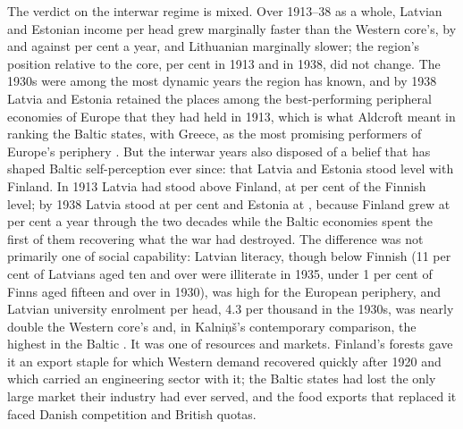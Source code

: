 


The verdict on the interwar regime is mixed. Over 1913--38 as a whole, Latvian and Estonian income per head grew marginally faster than the Western core's, by  and  against  per cent a year, and Lithuanian marginally slower; the region's position relative to the core,  per cent in 1913 and  in 1938, did not change. The 1930s were among the most dynamic years the region has known, and by 1938 Latvia and Estonia retained the places among the best-performing peripheral economies of Europe that they had held in 1913, which is what Aldcroft meant in ranking the Baltic states, with Greece, as the most promising performers of Europe's periphery \parencite[105, 171]{aldcroftthirdworld}. But the interwar years also disposed of a belief that has shaped Baltic self-perception ever since: that Latvia and Estonia stood level with Finland. In 1913 Latvia had stood above Finland, at  per cent of the Finnish level; by 1938 Latvia stood at  per cent and Estonia at , because Finland grew at  per cent a year through the two decades while the Baltic economies spent the first of them recovering what the war had destroyed. The difference was not primarily one of social capability: Latvian literacy, though below Finnish (11 per cent of Latvians aged ten and over were illiterate in 1935, under 1 per cent of Finns aged fifteen and over in 1930), was high for the European periphery, and Latvian university enrolment per head, 4.3 per thousand in the 1930s, was nearly double the Western core's and, in Kalniņš's contemporary comparison, the highest in the Baltic \parencites[25]{klimantas2025thesis}[102--3]{norkusdvides}. It was one of resources and markets. Finland's forests gave it an export staple for which Western demand recovered quickly after 1920 and which carried an engineering sector with it; the Baltic states had lost the only large market their industry had ever served, and the food exports that replaced it faced Danish competition and British quotas.

